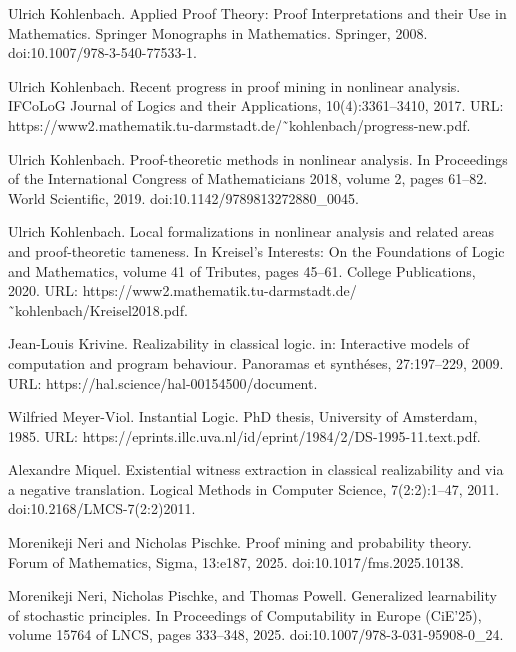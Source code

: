 \par\noindent  [18]  Ulrich Kohlenbach.  Applied Proof Theory: Proof Interpretations and their Use in Mathematics.  Springer Monographs in Mathematics. Springer, 2008.  doi:10.1007/978-3-540-77533-1.  
 
\par\noindent  [19]  Ulrich Kohlenbach.  Recent progress in proof mining in nonlinear analysis.  IFCoLoG Journal of Logics and their Applications, 10(4):3361–3410, 2017.  URL: https://www2.mathematik.tu-darmstadt.de/˜kohlenbach/progress-new.pdf.  
 
\par\noindent  [20]  Ulrich Kohlenbach.  Proof-theoretic methods in nonlinear analysis.  In Proceedings of the International Congress of Mathematicians 2018, volume 2, pages 61–82. World Scientific, 2019.  doi:10.1142/9789813272880\_0045.  
 
\par\noindent  [21]  Ulrich Kohlenbach.  Local formalizations in nonlinear analysis and related areas and proof-theoretic tameness.  In Kreisel’s Interests: On the Foundations of Logic and Mathematics, volume 41 of Tributes, pages 45–61. College Publications, 2020.  URL: https://www2.mathematik.tu-darmstadt.de/˜kohlenbach/Kreisel2018.pdf.  
 
\par\noindent  [22]  Jean-Louis Krivine.  Realizability in classical logic. in: Interactive models of computation and program behaviour.  Panoramas et synthéses, 27:197–229, 2009.  URL: https://hal.science/hal-00154500/document.  
 
\par\noindent  [23]  Wilfried Meyer-Viol.  Instantial Logic.  PhD thesis, University of Amsterdam, 1985.  URL: https://eprints.illc.uva.nl/id/eprint/1984/2/DS-1995-11.text.pdf.  
 
\par\noindent  [24]  Alexandre Miquel.  Existential witness extraction in classical realizability and via a negative translation.  Logical Methods in Computer Science, 7(2:2):1–47, 2011.  doi:10.2168/LMCS-7(2:2)2011.  
 
\par\noindent  [25]  Morenikeji Neri and Nicholas Pischke.  Proof mining and probability theory.  Forum of Mathematics, Sigma, 13:e187, 2025.  doi:10.1017/fms.2025.10138.  
 
\par\noindent  [26]  Morenikeji Neri, Nicholas Pischke, and Thomas Powell.  Generalized learnability of stochastic principles.  In Proceedings of Computability in Europe (CiE’25), volume 15764 of LNCS, pages 333–348, 2025.  doi:10.1007/978-3-031-95908-0\_24.  
 
